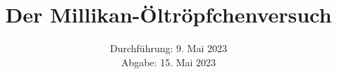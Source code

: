 

\subject{\texorpdfstring{\vspace{2ex}}{}V503\texorpdfstring{\vspace{-2ex}}{}} %
\title{Der Millikan-Öltröpfchenversuch} %
\date{
	Durchführung: 9. Mai 2023 %
	\\ Abgabe: 15. Mai 2023 %
}




\maketitle
\thispagestyle{empty}


\tableofcontents
\newpage







\printbibliography{}

\newpage



